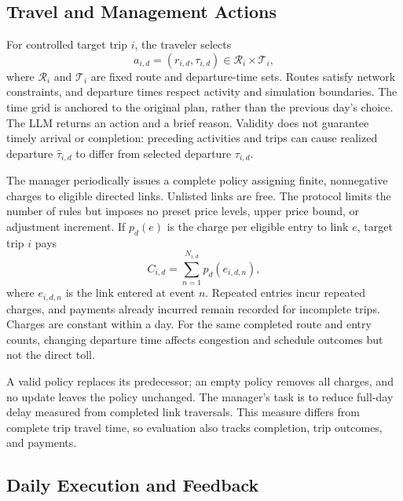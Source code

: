 \subsection{Travel and Management Actions}
\label{sec:actions-implementation}

For controlled target trip $i$, the traveler selects
\begin{equation}
    a_{i,d}=(r_{i,d},\tau_{i,d})\in\mathcal{R}_i\times\mathcal{T}_i,
    \label{eq:joint-action}
\end{equation}
where $\mathcal{R}_i$ and $\mathcal{T}_i$ are fixed route and departure-time sets. Routes satisfy network constraints, and departure times respect activity and simulation boundaries. The time grid is anchored to the original plan, rather than the previous day's choice. The LLM returns an action and a brief reason. Validity does not guarantee timely arrival or completion: preceding activities and trips can cause realized departure $\hat{\tau}_{i,d}$ to differ from selected departure $\tau_{i,d}$.

The manager periodically issues a complete policy assigning finite, nonnegative charges to eligible directed links. Unlisted links are free. The protocol limits the number of rules but imposes no preset price levels, upper price bound, or adjustment increment. If $p_d(e)$ is the charge per eligible entry to link $e$, target trip $i$ pays
\begin{equation}
    C_{i,d}=\sum_{n=1}^{N_{i,d}}p_d(e_{i,d,n}),
    \label{eq:realized-payment}
\end{equation}
where $e_{i,d,n}$ is the link entered at event $n$. Repeated entries incur repeated charges, and payments already incurred remain recorded for incomplete trips. Charges are constant within a day. For the same completed route and entry counts, changing departure time affects congestion and schedule outcomes but not the direct toll.

A valid policy replaces its predecessor; an empty policy removes all charges, and no update leaves the policy unchanged. The manager's task is to reduce full-day delay measured from completed link traversals. This measure differs from complete trip travel time, so evaluation also tracks completion, trip outcomes, and payments.

\subsection{Daily Execution and Feedback}
\label{sec:daily-cycle-implementation}

